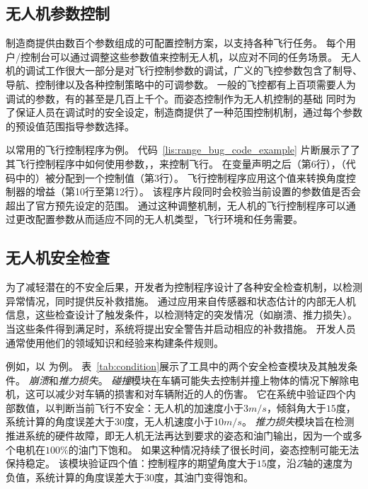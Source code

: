 \subsection{无人机参数控制}\label{subsec:drone_control}
制造商提供由数百个参数组成的可配置控制方案，以支持各种飞行任务。
每个用户/控制台可以通过调整这些参数值来控制无人机，以应对不同的任务场景。
无人机的调试工作很大一部分是对飞行控制参数的调试，广义的飞控参数包含了制导、导航、控制律以及各种控制策略中的可调参数。
一般的飞控都有上百项需要人为调试的参数，有的甚至是几百上千个。而姿态控制作为无人机控制的基础
同时为了保证人员在调试时的安全设定，制造商提供了一种范围控制机制，通过每个参数的预设值范围指导参数选择。

以常用的飞行控制程序为例。
代码~\ref{lis:range_bug_code_example} 片断展示了了其飞行控制程序中如何使用参数，，来控制飞行。
在变量声明之后（第6行），（代码中的）被分配到一个控制值（第3行）。
飞行控制程序应用这个值来转换角度控制器的增益（第10行至第12行）。
该程序片段同时会校验当前设置的参数值是否会超出了官方预先设定的范围。
通过这种调整机制，无人机的飞行控制程序可以通过更改配置参数从而适应不同的无人机类型，飞行环境和任务需要。


\subsection{无人机安全检查}
为了减轻潜在的不安全后果，开发者为控制程序设计了各种安全检查机制，以检测异常情况，同时提供反补救措施。
通过应用来自传感器和状态估计的内部无人机信息，这些检查设计了触发条件，以检测特定的突发情况（如崩溃、推力损失）。
当这些条件得到满足时，系统将提出安全警告并启动相应的补救措施。
开发人员通常使用他们的领域知识和经验来构建条件规则。

例如，以 为例。
表~\ref{tab:condition}展示了工具中的两个安全检查模块及其触发条件。
\emph{崩溃}和\emph{推力损失}。
\emph{碰撞}模块在车辆可能失去控制并撞上物体的情况下解除电机，这可以减少对车辆的损害和对车辆附近的人的伤害。
它在系统中验证四个内部数值，以判断当前飞行不安全：无人机的加速度小于$3m/s$，倾斜角大于$15$度，系统计算的角度误差大于$30$度，无人机速度小于$10m/s$。
\emph{推力损失}模块旨在检测推进系统的硬件故障，即无人机无法再达到要求的姿态和油门输出，因为一个或多个电机在$100\%$的油门下饱和。
如果这种情况持续了很长时间，姿态控制可能无法保持稳定。
该模块验证四个值：控制程序的期望角度大于$15$度，沿$Z$轴的速度为负值，系统计算的角度误差大于$30$度，其油门变得饱和。

